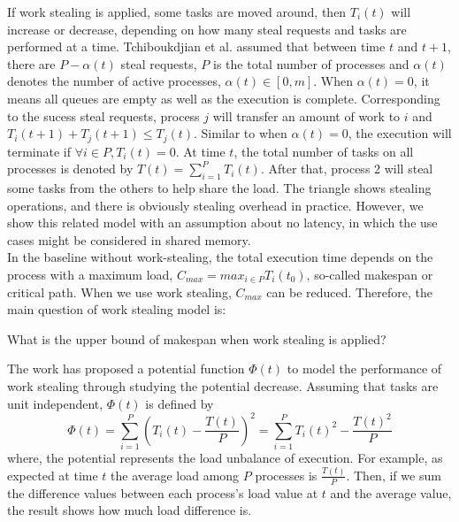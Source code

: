 If work stealing is applied, some tasks are moved around, then $T_{i}(t)$ will increase or decrease, depending on how many steal requests and tasks are performed at a time. Tchiboukdjian et al. \cite{tchiboukdjian2010tighter} \cite{tchiboukdjian2013decentralized} assumed that between time $t$ and $t+1$, there are $P - \alpha(t)$ steal requests, $P$ is the total number of processes and $\alpha(t)$ denotes the number of active processes, $\alpha(t) \in [0, m]$. When $\alpha(t)=0$, it means all queues are empty as well as the execution is complete. Corresponding to the sucess steal requests, process $j$ will transfer an amount of work to $i$ and $T_{i}(t+1) + T_{j}(t+1) \leq T_{j}(t)$. Similar to when $\alpha(t)=0$, the execution will terminate if $\forall i \in P, T_{i}(t) = 0$. At time $t$, the total number of tasks on all processes is denoted by $T(t) = \sum_{i=1}^{P}T_{i}(t)$. After that, process $2$ will steal some tasks from the others to help share the load. The triangle shows stealing operations, and there is obviously stealing overhead in practice. However, we show this related model with an assumption about no latency, in which the use cases might be considered in shared memory.\\

In the baseline without work-stealing, the total execution time depends on the process with a maximum load, $C_{max} = max_{i \in P} T_i(t_0)$, so-called makespan or critical path. When we use work stealing, $C_{max}$ can be reduced. Therefore, the main question of work stealing model is:
\begin{shaded}
	\noindent What is the upper bound of makespan when work stealing is applied?
\end{shaded}

The work has proposed a potential function $\Phi (t)$ to model the performance of work stealing through studying the potential decrease. Assuming that tasks are unit independent, $\Phi (t)$ is defined by
\begin{equation} \label{eq:phi_defi}
	\Phi(t) = \sum_{i=1}^{P} (T_{i}(t) - \frac{T(t)}{P})^{2} = \sum_{i=1}^{P} T_{i}(t)^{2} - \frac{T(t)^2}{P}
\end{equation}
where, the potential represents the load unbalance of execution. For example, as expected at time $t$ the average load among $P$ processes is $\frac{T(t)}{P}$. Then, if we sum the difference values between each process's load value at $t$ and the average value, the result shows how much load difference is. \\

